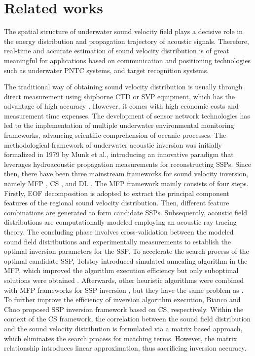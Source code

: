 \section{Related works}
The spatial structure of underwater sound velocity field plays a decisive role in the energy distribution and propagation trajectory of acoustic signals. Therefore, real-time and accurate estimation of sound velocity distribution is of great meaningful for applications based on communication and positioning technologies such as underwater PNTC systems, and target recognition systems.

The traditional way of obtaining sound velocity distribution is usually through direct measurement using shipborne CTD or SVP equipment, which has the advantage of high accuracy \cite{Kirimoto2024CTD,Luo2023CTD}. However, it comes with high economic costs and measurement time expenses. The development of sensor network technologies has led to the implementation of multiple underwater environmental monitoring frameworks, advancing scientific comprehension of oceanic processes. The methodological framework of underwater acoustic inversion was initially formalized in 1979 by Munk et al.\cite{MUNK1979Tomography,Munk1983Tomography}, introducing an innovative paradigm that leverages hydroacoustic propagation measurements for reconstructing SSPs. Since then, there have been three mainstream frameworks for sound velocity inversion, namely MFP \cite{Tolstoy1991MFP}, CS \cite{Choo2018CS, Bianco2017CS}, and DL \cite{Huang2021SSPInversion, Huang2023Meta}. The MFP framework mainly consists of four steps. Firstly, EOF decomposition is adopted to extract the principal component features of the regional sound velocity distribution. Then, different feature combinations are generated to form candidate SSPs. Subsequently, acoustic field distributions are computationally modeled employing an acoustic ray tracing theory. The concluding phase involves cross-validation between the modeled sound field distributions and experimentally measurements to establish the optimal inversion parameters for the SSP. To accelerate the search process of the optimal candidate SSP, Tolstoy introduced simulated annealing algorithm in the MFP, which improved the algorithm execution efficiency but only suboptimal solutions were obtained \cite{Tolstoy1991MFP}. Afterwards, other heuristic algorithms were combined with MFP frameworks for SSP inversion \cite{Zhang2012MFP,Zhang2016SSPAUVInv}, but they have the same problem as \cite{Tolstoy1991MFP}. To further improve the efficiency of inversion algorithm execution, Bianco \cite{Bianco2017CS} and Choo \cite{Choo2018CS} proposed SSP inversion framework based on CS, respectively. Within the context of the CS framework, the correlation between the sound field distribution and the sound velocity distribution is formulated via a matrix based approach, which eliminates the search process for matching terms. However, the matrix relationship introduces linear approximation, thus sacrificing inversion accuracy.

